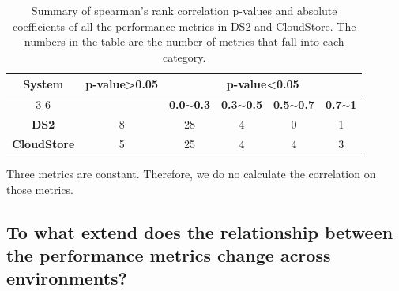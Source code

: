 \documentclass[smallextended]{svjour3}       %
\begin{document}
\begin{table}[tbh]
	\centering
	\caption{Summary of spearman's rank correlation p-values and absolute coefficients of all the performance metrics in DS2 and CloudStore. The numbers in the table are the number of metrics that fall into each category.}
	\label{tab:correlationall}
	\begin{threeparttable}
		
		\begin{tabular}{|c||c|c|c|c|c|}
			\hline
			\multirow{3}{*}{\textbf{System}} & \multirow{3}{*}{\textbf{p-value\textgreater0.05}} & \multicolumn{4}{c|}{\textbf{p-value\textless0.05}} \\ \cline{3-6} 
			&  & \textbf{0.0$\sim$0.3} & \textbf{0.3$\sim$0.5} & \textbf{0.5$\sim$0.7} & \textbf{0.7$\sim$1} \\ %
			\midrule 
			\midrule 
			\textbf{DS2} & 8 & 28 & 4 & 0 & 1 \\ \hline
			\textbf{CloudStore} & 5 & 25 & 4 & 4 & 3 \\ \hline
		\end{tabular}%
		\begin{tablenotes}
			\item Three metrics are constant. Therefore, we do no calculate the correlation on those metrics.
		\end{tablenotes}
	\end{threeparttable}
	
\end{table}



\subsection{To what extend does the relationship between the performance metrics change across environments?}

\label{sec:relation}
\end{document}
